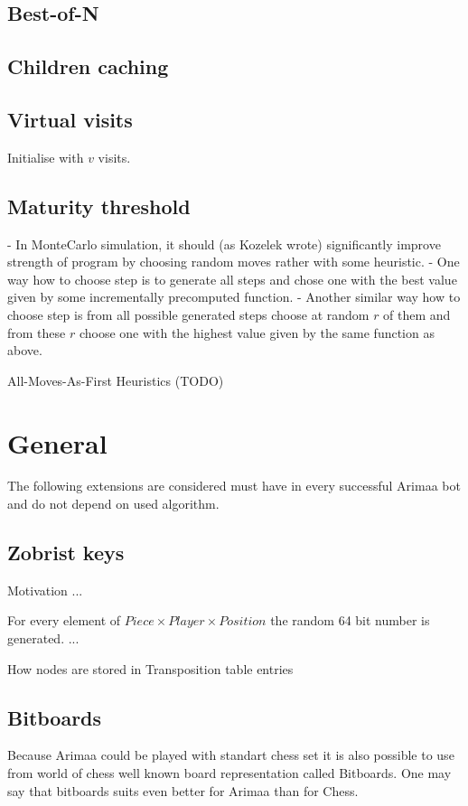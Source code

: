 \documentclass[12pt,titlepage,fleqn]{report}
\begin{document}
\subsection{Best-of-N}
\subsection{Children caching}
\subsection{Virtual visits}
Initialise with $v$ visits.
\subsection{Maturity threshold}

- In MonteCarlo simulation, it should (as Kozelek wrote) significantly improve
  strength of program by choosing random moves rather with some heuristic.
	- One way how to choose step is to generate all steps and chose one with
	  the best value given by some incrementally precomputed function.
	- Another similar way how to choose step is from all possible generated
	  steps choose at random $r$ of them and from these $r$ choose one with the
	  highest value given by the same function as above.

All-Moves-As-First Heuristics (TODO)

\section{General}
The following extensions are considered must have in every successful Arimaa
bot and do not depend on used algorithm.

	\subsection{Zobrist keys}
	Motivation ...

	For every element of $Piece\times Player\times Position$ the random 64 bit
	number is generated. ...

	How nodes are stored in Transposition table entries

	\subsection{Bitboards}
	Because Arimaa could be played with standart chess set it is also possible
	to use from world of chess well known board representation called
	Bitboards. One may say that bitboards suits even better for Arimaa than for
	Chess.
\end{document}
